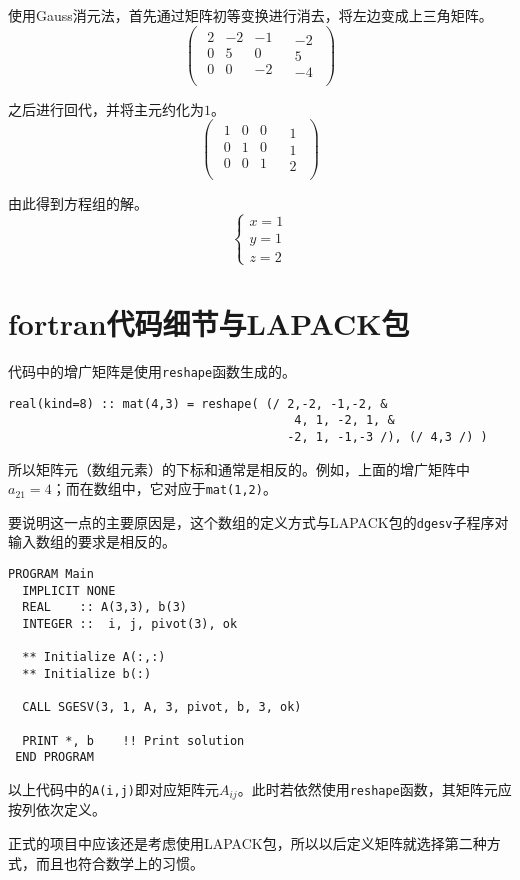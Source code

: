 \documentclass{ctexart}
\begin{document}
使用Gauss消元法，首先通过矩阵初等变换进行消去，将左边变成上三角矩阵。
\[
\left(
\begin{array}{c|c}
\begin{matrix}
2 & -2 & -1 \\
0 &  5 &  0 \\
0 &  0 & -2 \\
\end{matrix}&
\begin{matrix}
-2 \\
 5 \\
-4
\end{matrix}
\end{array}
\right)
\]

之后进行回代，并将主元约化为$1$。
\[
\left(
\begin{array}{c|c}
\begin{matrix}
1 & 0 & 0 \\
0 & 1 & 0 \\
0 & 0 & 1 \\
\end{matrix}&
\begin{matrix}
1 \\
1 \\
2
\end{matrix}
\end{array}
\right)
\]

由此得到方程组的解。
\[
\begin{cases}
x=1 \\
y=1 \\
z=2
\end{cases}
\]

\section{fortran代码细节与LAPACK包}
代码中的增广矩阵是使用\lstinline!reshape!函数生成的。
\begin{lstlisting}[frame=trBL]
 real(kind=8) :: mat(4,3) = reshape( (/ 2,-2, -1,-2, &
                                        4, 1, -2, 1, &
                                       -2, 1, -1,-3 /), (/ 4,3 /) )
\end{lstlisting}
所以矩阵元（数组元素）的下标和通常是相反的。例如，上面的增广矩阵中$a_{21}=4$；而在数组中，它对应于\lstinline!mat(1,2)!。

要说明这一点的主要原因是，这个数组的定义方式与LAPACK包的\lstinline!dgesv!子程序对输入数组的要求是相反的。

\begin{lstlisting}[frame=trBL]
 PROGRAM Main
  IMPLICIT NONE
  REAL    :: A(3,3), b(3)
  INTEGER ::  i, j, pivot(3), ok

  ** Initialize A(:,:)
  ** Initialize b(:)

  CALL SGESV(3, 1, A, 3, pivot, b, 3, ok)    

  PRINT *, b    !! Print solution
 END PROGRAM
\end{lstlisting}

以上代码中的\lstinline!A(i,j)!即对应矩阵元$A_{ij}$。此时若依然使用\lstinline!reshape!函数，其矩阵元应按列依次定义。

正式的项目中应该还是考虑使用LAPACK包，所以以后定义矩阵就选择第二种方式，而且也符合数学上的习惯。
\end{document}
